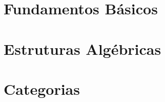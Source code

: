 \documentclass[10pt, a4paper]{book}
\begin{document}
\frontmatter




\tableofcontents

\mainmatter

\part{Fundamentos Básicos}




\part{Estruturas Algébricas}
%

\part{Categorias}

{}	%
\end{document}
